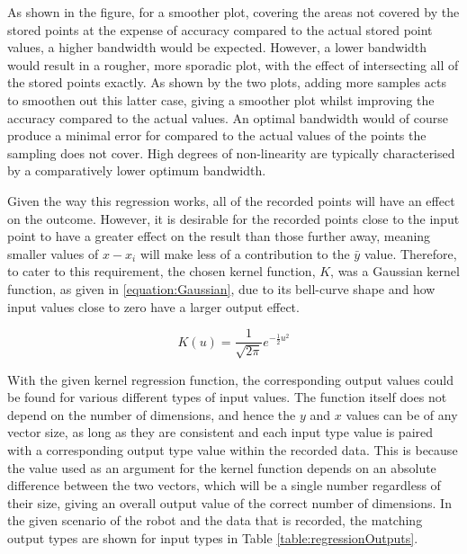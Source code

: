 \documentclass[11pt]{article}
\begin{document}
As shown in the figure, for a smoother plot, covering the areas not covered by the stored points at the expense of accuracy compared to the actual stored point values, a higher bandwidth would be expected. However, a lower bandwidth would result in a rougher, more sporadic plot, with the effect of intersecting all of the stored points exactly. As shown by the two plots, adding more samples acts to smoothen out this latter case, giving a smoother plot whilst improving the accuracy compared to the actual values. An optimal bandwidth would of course produce a minimal error for compared to the actual values of the points the sampling does not cover. High degrees of non-linearity are typically characterised by a comparatively lower optimum bandwidth.

Given the way this regression works, all of the recorded points will have an effect on the outcome. However, it is desirable for the recorded points close to the input point to have a greater effect on the result than those further away, meaning smaller values of $x - x_{i}$ will make less of a contribution to the $\bar{y}$ value. Therefore, to cater to this requirement, the chosen kernel function, $K$, was a Gaussian kernel function, as given in \eqref{equation:Gaussian}, due to its bell-curve shape and how input values close to zero have a larger output effect.

\begin{equation}\label{equation:Gaussian}
K(u) = \frac{1}{\sqrt{2\pi}}e^{-\frac{1}{2}u^2}
\end{equation}

With the given kernel regression function, the corresponding output values could be found for various different types of input values. The function itself does not depend on the number of dimensions, and hence the $y$ and $x$ values can be of any vector size, as long as they are consistent and each input type value is paired with a corresponding output type value within the recorded data. This is because the value used as an argument for the kernel function depends on an absolute difference between the two vectors, which will be a single number regardless of their size, giving an overall output value of the correct number of dimensions. In the given scenario of the robot and the data that is recorded, the matching output types are shown for input types in Table \ref{table:regressionOutputs}.
\end{document}

